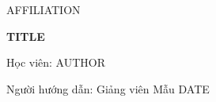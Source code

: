 \begin{titlepage}\centering
{\Large {{AFFILIATION}}\par}\vspace{2cm}
{\Huge\bfseries {{TITLE}}\par}\vspace{1cm}
Học viên: {{AUTHOR}}\par
Người hướng dẫn: Giảng viên Mẫu\vfill
{{DATE}}\end{titlepage}
